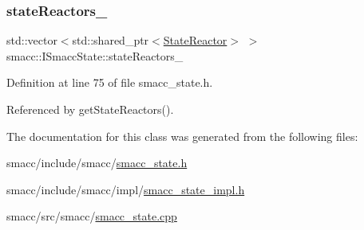 \subsubsection{\texorpdfstring{state\+Reactors\+\_\+}{stateReactors\_}}
{\footnotesize\ttfamily std\+::vector$<$std\+::shared\+\_\+ptr$<$\hyperlink{classsmacc_1_1StateReactor}{State\+Reactor}$>$ $>$ smacc\+::\+I\+Smacc\+State\+::state\+Reactors\+\_\+\hspace{0.3cm}{\ttfamily [protected]}}



Definition at line 75 of file smacc\+\_\+state.\+h.



Referenced by get\+State\+Reactors().



The documentation for this class was generated from the following files\+:\begin{DoxyCompactItemize}
\item 
smacc/include/smacc/\hyperlink{smacc__state_8h}{smacc\+\_\+state.\+h}\item 
smacc/include/smacc/impl/\hyperlink{smacc__state__impl_8h}{smacc\+\_\+state\+\_\+impl.\+h}\item 
smacc/src/smacc/\hyperlink{smacc__state_8cpp}{smacc\+\_\+state.\+cpp}\end{DoxyCompactItemize}
